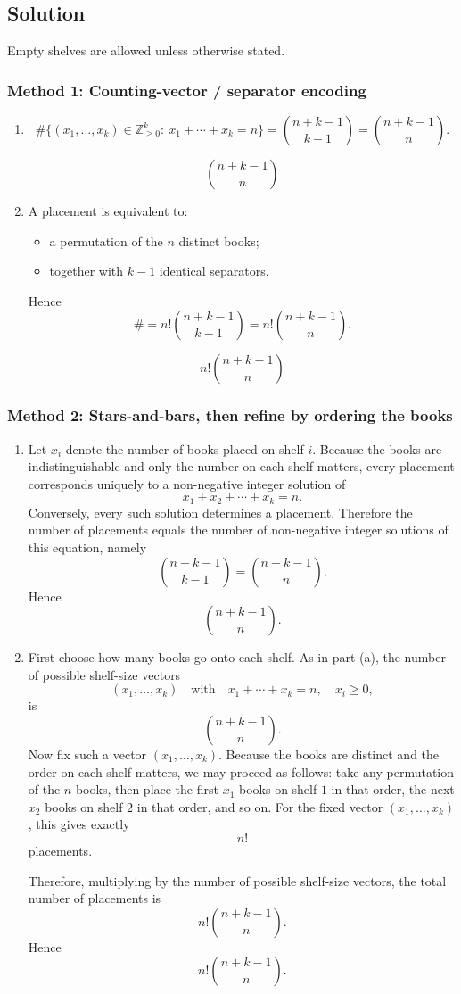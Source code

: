 \documentclass[12pt]{article}
\begin{document}
\subsection{Solution}
Empty shelves are allowed unless otherwise stated.

\subsubsection{Method 1: Counting-vector / separator encoding}
\begin{enumerate}[label=(\alph*)]
\item
\[
\#\{(x_1,\dots,x_k)\in\mathbb Z_{\ge0}^k:\ x_1+\cdots+x_k=n\}
=\binom{n+k-1}{k-1}
=\binom{n+k-1}{n}.
\]

\[
\boxed{\binom{n+k-1}{n}}
\]

\item A placement is equivalent to:
\begin{itemize}[leftmargin=*]
\item a permutation of the \(n\) distinct books;
\item together with \(k-1\) identical separators.
\end{itemize}
Hence
\[
\#=n!\binom{n+k-1}{k-1}
=n!\binom{n+k-1}{n}.
\]

\[
\boxed{n!\binom{n+k-1}{n}}
\]
\end{enumerate}

\newpage
\subsubsection{Method 2: Stars-and-bars, then refine by ordering the books}
\begin{enumerate}[label=(\alph*)]
\item Let $x_i$ denote the number of books placed on shelf $i$. Because the books are indistinguishable and only the number on each shelf matters, every placement corresponds uniquely to a non-negative integer solution of
\[
x_1+x_2+\cdots +x_k=n.
\]
Conversely, every such solution determines a placement. Therefore the number of placements equals the number of non-negative integer solutions of this equation, namely
\[
\binom{n+k-1}{k-1}=\binom{n+k-1}{n}.
\]
Hence
\[
\boxed{\binom{n+k-1}{n}}.
\]

\item First choose how many books go onto each shelf. As in part (a), the number of possible shelf-size vectors
\[
(x_1,\dots,x_k) \quad \text{with} \quad x_1+\cdots+x_k=n, \quad x_i\ge 0,
\]
is
\[
\binom{n+k-1}{n}.
\]
Now fix such a vector $(x_1,\dots,x_k)$. Because the books are distinct and the order on each shelf matters, we may proceed as follows: take any permutation of the $n$ books, then place the first $x_1$ books on shelf $1$ in that order, the next $x_2$ books on shelf $2$ in that order, and so on. For the fixed vector $(x_1,\dots,x_k)$, this gives exactly
\[
n!
\]
placements.

Therefore, multiplying by the number of possible shelf-size vectors, the total number of placements is
\[
n!\binom{n+k-1}{n}.
\]
Hence
\[
\boxed{n!\binom{n+k-1}{n}}.
\]
\end{enumerate}
\end{document}
